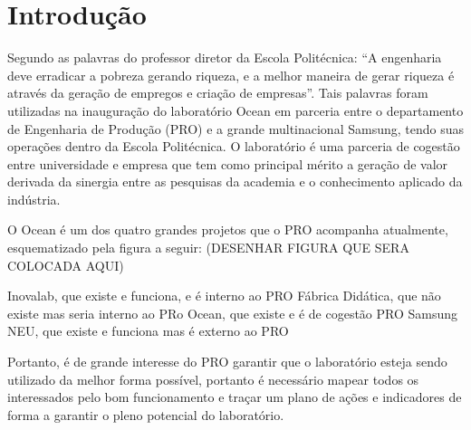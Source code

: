 \chapter[Introdução]{Introdução}
\label{chap:introducao}

Segundo as palavras do professor diretor da Escola Politécnica: “A engenharia deve erradicar a pobreza gerando riqueza, e a melhor maneira de gerar riqueza é através da geração de empregos e criação de empresas”. Tais palavras foram utilizadas na inauguração do laboratório Ocean em parceria entre o departamento de Engenharia de Produção (PRO) e a grande multinacional Samsung, tendo suas operações dentro da Escola Politécnica. O laboratório é uma parceria de cogestão entre universidade e empresa que tem como principal mérito a geração de valor derivada da sinergia entre as pesquisas da academia e o conhecimento aplicado da indústria. 

O Ocean é um dos quatro grandes projetos que o PRO acompanha atualmente, esquematizado pela figura a seguir: (DESENHAR FIGURA QUE SERA COLOCADA AQUI)

Inovalab, que existe e funciona, e é interno ao PRO
Fábrica Didática, que não existe mas seria interno ao PRo
Ocean, que existe e é de cogestão PRO Samsung
NEU, que existe e funciona mas é externo ao PRO

Portanto, é de grande interesse do PRO garantir que o laboratório esteja sendo utilizado da melhor forma possível, portanto é necessário mapear todos os interessados pelo bom funcionamento e traçar um plano de ações e indicadores de forma a garantir o pleno potencial do laboratório.
